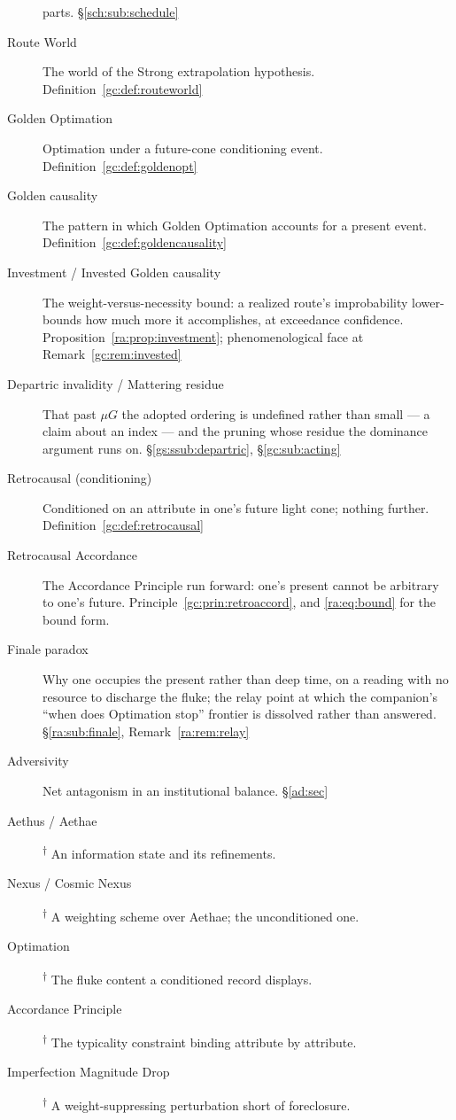\documentclass[11pt]{article}
\numberwithin{equation}{section}
\theoremstyle{plain}
\theoremstyle{definition}
\theoremstyle{remark}
\begin{document}
\begin{description}
parts. \S\ref{sch:sub:schedule}
\item[Route World] The world of the Strong extrapolation hypothesis.
Definition~\ref{gc:def:routeworld}
\item[Golden Optimation] Optimation under a future-cone conditioning
event. Definition~\ref{gc:def:goldenopt}
\item[Golden causality] The pattern in which Golden Optimation accounts
for a present event. Definition~\ref{gc:def:goldencausality}
\item[Investment / Invested Golden causality] The weight-versus-necessity
bound: a realized route's improbability lower-bounds how much more it
accomplishes, at exceedance confidence. Proposition~\ref{ra:prop:investment};
phenomenological face at Remark~\ref{gc:rem:invested}
\item[Departric invalidity / Mattering residue] That past $\mu G$ the
adopted ordering is undefined rather than small --- a claim about an
index --- and the pruning whose residue the dominance argument runs on.
\S\ref{gs:ssub:departric}, \S\ref{gc:sub:acting}
\item[Retrocausal (conditioning)] Conditioned on an attribute in one's
future light cone; nothing further. Definition~\ref{gc:def:retrocausal}
\item[Retrocausal Accordance] The Accordance Principle run forward: one's
present cannot be arbitrary to one's future.
Principle~\ref{gc:prin:retroaccord}, and \eqref{ra:eq:bound} for the
bound form.
\item[Finale paradox] Why one occupies the present rather than deep time,
on a reading with no resource to discharge the fluke; the relay point at
which the companion's ``when does Optimation stop'' frontier is
dissolved rather than answered. \S\ref{ra:sub:finale},
Remark~\ref{ra:rem:relay}
\item[Adversivity] Net antagonism in an institutional balance.
\S\ref{ad:sec}
\item[Aethus / Aethae]\textsuperscript{$\dagger$} An information state
and its refinements.
\item[Nexus / Cosmic Nexus]\textsuperscript{$\dagger$} A weighting scheme
over Aethae; the unconditioned one.
\item[Optimation]\textsuperscript{$\dagger$} The fluke content a
conditioned record displays.
\item[Accordance Principle]\textsuperscript{$\dagger$} The typicality
constraint binding attribute by attribute.
\item[Imperfection Magnitude Drop]\textsuperscript{$\dagger$} A
weight-suppressing perturbation short of foreclosure.
\end{description}
\end{document}
